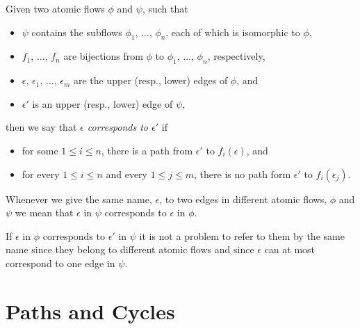 

\begin{definition}\label{definition:CorrespondingEdges}
Given two atomic flows $\phi$ and $\psi$, such that
\begin{itemize}
  \item $\psi$ contains the subflows $\phi_1$, $\dots$, $\phi_n$, each of which is isomorphic to $\phi$,
  \item $f_1$, $\dots$, $f_n$ are bijections from $\phi$ to $\phi_1$, $\dots$, $\phi_n$, respectively,
  \item $\epsilon$, $\epsilon_1$, $\dots$, $\epsilon_m$ are the upper (resp., lower) edges of $\phi$, and
  \item $\epsilon'$ is an upper (resp., lower) edge of $\psi$,
\end{itemize}
then we say that \emph{$\epsilon$ corresponds to $\epsilon'$} if
\begin{itemize}
  \item for some $1\le i\le n$, there is a path from $\epsilon'$ to $f_i(\epsilon)$, and
  \item for every $1\le i\le n$ and every $1\le j \le m$, there is no path form $\epsilon'$ to $f_i(\epsilon_j)$.
\end{itemize}
Whenever we give the same name, $\epsilon$, to two edges in different atomic flows, $\phi$ and $\psi$ we mean that $\epsilon$ in $\psi$ corresponds to $\epsilon$ in $\phi$.
\end{definition}


\begin{remark}
If $\epsilon$ in $\phi$ corresponds to $\epsilon'$ in $\psi$ it is not a problem to refer to them by the same name since they belong to different atomic flows and since $\epsilon$ can at most correspond to one edge in $\psi$.
\end{remark}


\section{Paths and Cycles}\label{section:PathsAndCycles}

